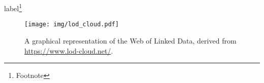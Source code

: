 
label\footnote{Footnote}

\autocite{...}
\textcite{...}

\begin{figure}[H]
\centering
\texttt{[image: img/lod\_cloud.pdf]}
\caption{A graphical representation of the Web of Linked Data, derived from
\url{https://www.lod-cloud.net/}.}\label{fig:lod-cloud}
\end{figure}


